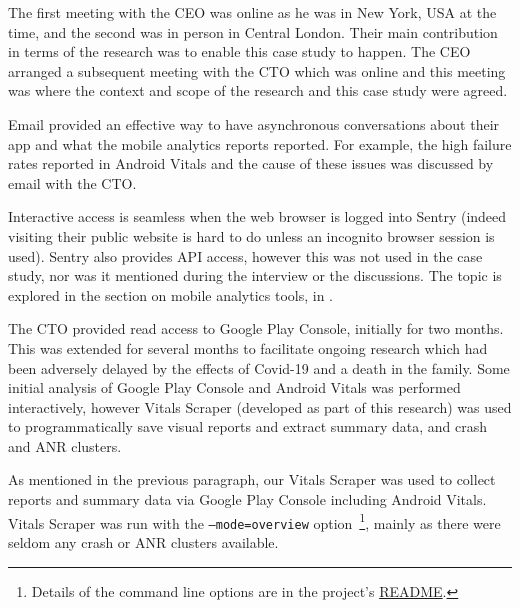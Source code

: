 
The first meeting with the CEO was online as he was in New York, USA at the time, and the second was in person in Central London. Their main contribution in terms of the research was to enable this case study to happen. The CEO arranged a subsequent meeting with the CTO which was online and this meeting was where the context and scope of the research and this case study were agreed. 


Email provided an effective way to have asynchronous conversations about their app and what the mobile analytics reports reported. For example, the high failure rates reported in Android Vitals and the cause of these issues was discussed by email with the CTO. 


Interactive access is seamless when the web browser is logged into Sentry (indeed visiting their public website is hard to do unless an incognito browser session is used). Sentry also provides API access, however this was not used in the case study, nor was it mentioned during the interview or the discussions. The topic is explored in the section on mobile analytics tools, in \href{analytics-tools-sentry}{}. 


The CTO provided read access to Google Play Console, initially for two months. This was extended for several months to facilitate ongoing research which had been adversely delayed by the effects of Covid-19 and a death in the family. Some initial analysis of Google Play Console and Android Vitals was performed interactively, however Vitals Scraper (developed as part of this research) was used to programmatically save visual reports and extract summary data, and crash and ANR clusters.


As mentioned in the previous paragraph, our Vitals Scraper was used to collect reports and summary data via Google Play Console including Android Vitals. Vitals Scraper was run with the \texttt{--mode=overview} option~\footnote{Details of the command line options are in the project's \href{https://github.com/commercetest/vitals-scraper}{README}.}, mainly as there were seldom any crash or ANR clusters available.

